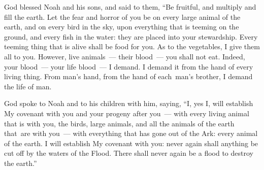 
\begin{inparaenum}
     God blessed Noah and his sons, and said to them, ``Be fruitful, and multiply and fill the earth.%
     Let the fear and horror of you be on every large animal of the earth, and on every bird in the sky, upon everything that is teeming on the ground, and every fish in the water: they are placed into your stewardship.%
     Every teeming thing that is alive shall be food for you. As to the vegetables, I give them all to you.%
     However, live animals~--- their blood~--- you shall not eat.%
     Indeed, your blood~--- your life blood\understood~--- I demand. I demand it from the hand of every living thing. From man's hand, from the hand of each\understood\ man's brother, I demand the life of man.%
    
    
    
    
     God spoke to Noah and to his children with him, saying,%
     ``I, yes I, will establish My covenant with you and your progeny after you~---%
     with every living animal that is with you, the birds, large animals, and all the animals of the earth that\understood\ are with you~--- with everything that has gone out of the Ark: every animal of the earth.%
     I will establish My covenant with you: never again shall anything be cut off by the waters of the Flood. There shall never again be a flood to destroy the earth.''%
    
    
    
\end{inparaenum}
